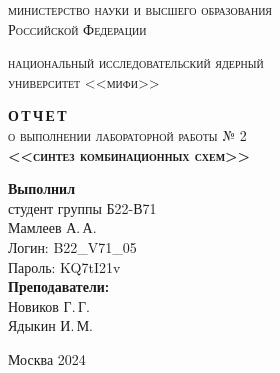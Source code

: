 \thispagestyle{empty}
\begin{center}
	{\scshape министерство науки и высшего образования \\Российской Федерации}
	\vspace{1ex}
	
	{\scshape национальный исследовательский ядерный\\университет <<мифи>>}
	\vspace{2.5 cm}
	
	{\scshape \textbf{О\,Т\,Ч\,Е\,Т}\\о выполнении лабораторной работы № 2}\\
	{\scshape \textbf{<<синтез комбинационных схем>>}}\\
	\rectangle{17cm}{6.5cm}
\end{center}

\vspace{1cm}
\hfill\parbox{0.35\linewidth}{
	\textbf{Выполнил}\\студент группы Б22-В71\\
	Мамлеев А.\,А.\\
	Логин: B22\_V71\_05\\
	Пароль: KQ7tI21v\\[1 ex]
	
	\textbf{Преподаватели:}\\
	Новиков Г.\,Г.\\
	Ядыкин И.\,М.
}





\vfill

\begin{center}
	Москва 2024
\end{center}